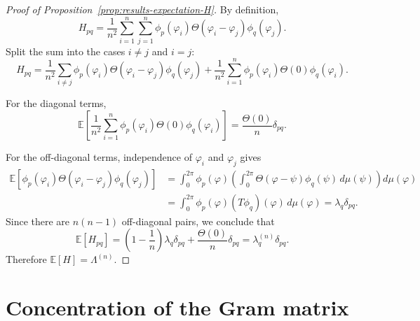 \begin{proof}[Proof of Proposition~\ref{prop:results-expectation-H}]
	By definition,
	\begin{equation}
		H_{pq}
		=
		\frac{1}{n^2}\sum_{i=1}^n\sum_{j=1}^n
		\phi_p(\varphi_i)\Theta(\varphi_i-\varphi_j)\phi_q(\varphi_j).
		\label{eq:app-H-entry}
	\end{equation}
	Split the sum into the cases \(i\neq j\) and \(i=j\):
	\[
		H_{pq}
		=
		\frac{1}{n^2}\sum_{i\neq j}
		\phi_p(\varphi_i)\Theta(\varphi_i-\varphi_j)\phi_q(\varphi_j)
		+
		\frac{1}{n^2}\sum_{i=1}^n
		\phi_p(\varphi_i)\Theta(0)\phi_q(\varphi_i).
	\]

	For the diagonal terms,
	\[
		\mathbb E\!\left[
			\frac{1}{n^2}\sum_{i=1}^n
			\phi_p(\varphi_i)\Theta(0)\phi_q(\varphi_i)
			\right]
		=
		\frac{\Theta(0)}{n}\delta_{pq}.
	\]

	For the off-diagonal terms, independence of \(\varphi_i\) and \(\varphi_j\) gives
	\begin{align*}
		\mathbb E\!\left[
			\phi_p(\varphi_i)\Theta(\varphi_i-\varphi_j)\phi_q(\varphi_j)
			\right]
		 & =
		\int_0^{2\pi}\phi_p(\varphi)
		\left(
		\int_0^{2\pi}\Theta(\varphi-\psi)\phi_q(\psi)\,d\mu(\psi)
		\right)
		d\mu(\varphi) \\
		 & =
		\int_0^{2\pi}\phi_p(\varphi)(T\phi_q)(\varphi)\,d\mu(\varphi)
		=
		\lambda_q\delta_{pq}.
	\end{align*}
	Since there are \(n(n-1)\) off-diagonal pairs, we conclude that
	\[
		\mathbb E[H_{pq}]
		=
		\left(1-\frac{1}{n}\right)\lambda_q\delta_{pq}
		+
		\frac{\Theta(0)}{n}\delta_{pq}
		=
		\lambda_q^{(n)}\delta_{pq}.
	\]
	Therefore \(\mathbb E[H]=\Lambda^{(n)}\).
\end{proof}

\section{Concentration of the Gram matrix}
\label{sec:app-gram-proof}

